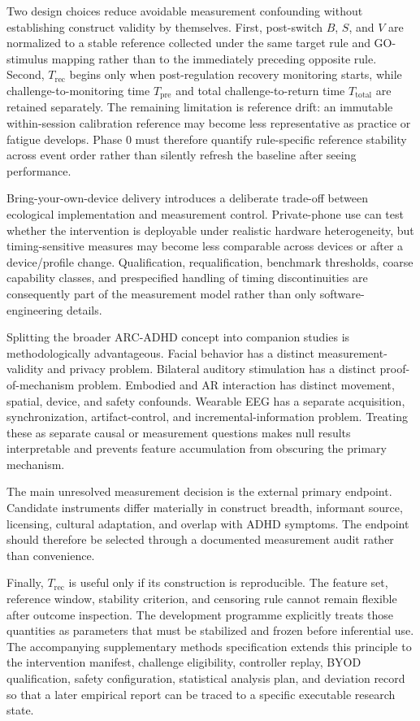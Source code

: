 Two design choices reduce avoidable measurement confounding without establishing construct validity by themselves. First, post-switch \(B\), \(S\), and \(V\) are normalized to a stable reference collected under the same target rule and GO-stimulus mapping rather than to the immediately preceding opposite rule. Second, \(T_{\mathrm{rec}}\) begins only when post-regulation recovery monitoring starts, while challenge-to-monitoring time \(T_{\mathrm{pre}}\) and total challenge-to-return time \(T_{\mathrm{total}}\) are retained separately. The remaining limitation is reference drift: an immutable within-session calibration reference may become less representative as practice or fatigue develops. Phase 0 must therefore quantify rule-specific reference stability across event order rather than silently refresh the baseline after seeing performance.

Bring-your-own-device delivery introduces a deliberate trade-off between ecological implementation and measurement control. Private-phone use can test whether the intervention is deployable under realistic hardware heterogeneity, but timing-sensitive measures may become less comparable across devices or after a device/profile change. Qualification, requalification, benchmark thresholds, coarse capability classes, and prespecified handling of timing discontinuities are consequently part of the measurement model rather than only software-engineering details.

Splitting the broader ARC-ADHD concept into companion studies is methodologically advantageous. Facial behavior has a distinct measurement-validity and privacy problem. Bilateral auditory stimulation has a distinct proof-of-mechanism problem. Embodied and AR interaction has distinct movement, spatial, device, and safety confounds. Wearable EEG has a separate acquisition, synchronization, artifact-control, and incremental-information problem. Treating these as separate causal or measurement questions makes null results interpretable and prevents feature accumulation from obscuring the primary mechanism.

The main unresolved measurement decision is the external primary endpoint. Candidate instruments differ materially in construct breadth, informant source, licensing, cultural adaptation, and overlap with ADHD symptoms. The endpoint should therefore be selected through a documented measurement audit rather than convenience.

Finally, \(T_{\mathrm{rec}}\) is useful only if its construction is reproducible. The feature set, reference window, stability criterion, and censoring rule cannot remain flexible after outcome inspection. The development programme explicitly treats those quantities as parameters that must be stabilized and frozen before inferential use. The accompanying supplementary methods specification extends this principle to the intervention manifest, challenge eligibility, controller replay, BYOD qualification, safety configuration, statistical analysis plan, and deviation record so that a later empirical report can be traced to a specific executable research state.
